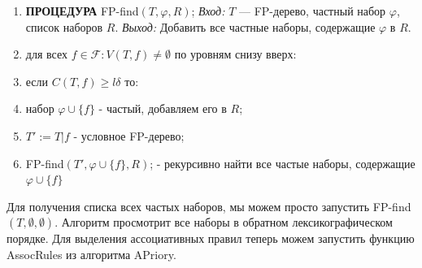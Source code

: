 \noindent\hrulefill %
\begin{enumerate}
    \item \textbf{ПРОЦЕДУРА} FP-find$(T,\varphi,R)$;
          \newline
          \quad \textit{Вход:} $T$ — FP-дерево, частный набор $\varphi$, список наборов $R$.
          \newline
          \quad \textit{Выход:} Добавить все частные наборы, содержащие $\varphi$ в $R$.
    \item \quad для всех $f \in \mathcal{F} : V(T,f) \neq \emptyset$ по уровням снизу вверх:
    \item \quad \quad если $C(T,f) \geq l\delta$ то:
    \item \quad \quad \quad набор $\varphi \cup \{f\}$ - частый, добавляем его в $R$;
    \item \quad \quad \quad $T':=T|f$ - условное FP-дерево;
    \item \quad \quad \quad FP-find$(T',\varphi \cup \{f\},R)$; - рекурсивно найти все частые наборы, содержащие $\varphi \cup \{f\}$
\end{enumerate}
\noindent\hrulefill %
\newline\newline
Для получения списка всех частых наборов, мы можем просто запустить FP-find$(T,\emptyset,\emptyset)$. Алгоритм просмотрит все наборы в обратном лексикографическом порядке. Для выделения ассоциативных правил теперь можем запустить функцию AssocRules из алгоритма APriory.

